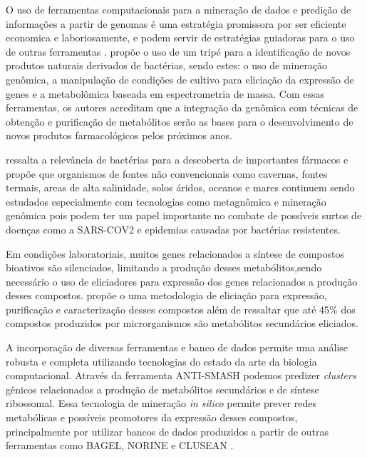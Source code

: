 O uso de ferramentas computacionais para a mineração 
de dados e predição de informações a partir de genomas é uma estratégia promissora por ser
eficiente economica e laboriosamente, e podem servir de estratégias guiadoras para o uso de outras 
ferramentas \cite{adamek2017mining}.  propõe o uso de um tripé para a identificação de novos produtos
naturais derivados de bactérias, sendo estes: o uso de mineração genômica, a manipulação de condições
de cultivo para eliciação da expressão de genes e a metabolômica baseada em espectrometria de massa. Com
essas ferramentas, os autores acreditam que a integração da genômica com técnicas de obtenção e purificação
de metabólitos serão as bases para o desenvolvimento de novos produtos farmacológicos pelos próximos anos.

 ressalta a relevância de bactérias para a descoberta de importantes
fármacos e propõe que organismos de fontes não convencionais como cavernas, fontes termais,
areas de alta salinidade, solos áridos, oceanos e mares continuem sendo estudados especialmente
com tecnologias como metagnômica e mineração genômica pois podem ter um papel importante no 
combate de possíveis surtos de doenças como a SARS-COV2 e epidemias causadas por bactérias resistentes.

Em condições laboratoriais, muitos genes relacionados a síntese de
compostos bioativos são silenciados, limitando a produção desses metabólitos,sendo necessário o uso de eliciadores para expressão dos genes relacionados a produção desses 
compostos\cite{rutledge2015}.  propõe o uma metodologia de eliciação para expressão, purificação
e caracterização desses compostos além de ressaltar que até 45\% dos compostos produzidos por
microrganismos são metabólitos secundários eliciados.

A incorporação de diversas ferramentas e banco de dados permite uma análise robusta 
e completa utilizando tecnologias do estado da arte da biologia computacional. Através da ferramenta ANTI-SMASH \cite{antismash} podemos predizer
\textit{clusters} gênicos relacionados a produção de metabólitos secundários
e de síntese ribossomal. Essa tecnologia de mineração \textit{in silico} permite prever redes
metabólicas e possíveis promotores da expressão desses compostos, principalmente por utilizar
bancos de dados produzidos a partir de outras ferramentas como BAGEL, NORINE e CLUSEAN \cite{bagel2,bagel3,norine,clusean}.

